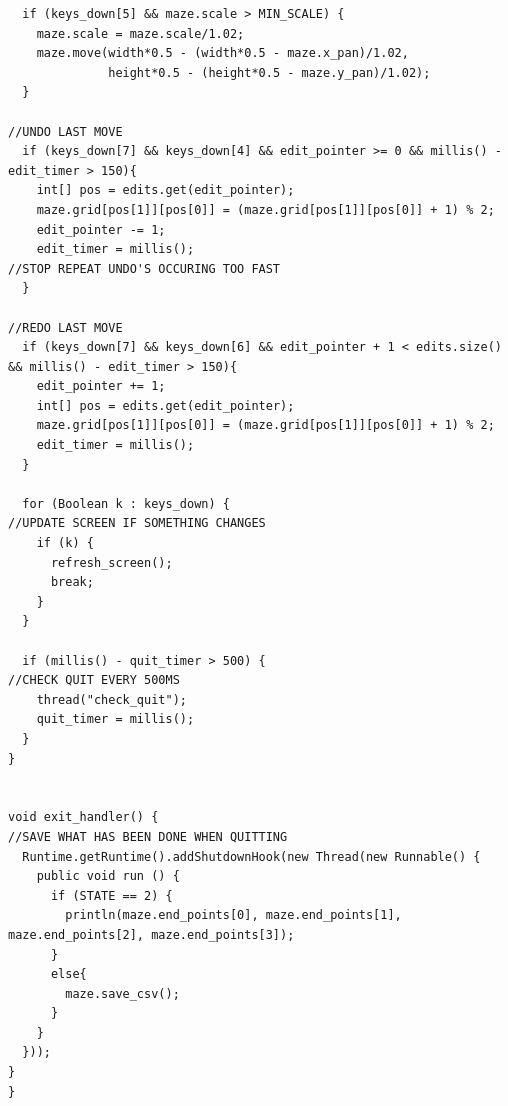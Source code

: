 \documentclass[titlepage]{article}
\begin{document}
\begin{changemargin}{-1in}{-1in}
\begin{verbatim}
  if (keys_down[5] && maze.scale > MIN_SCALE) {
    maze.scale = maze.scale/1.02;
    maze.move(width*0.5 - (width*0.5 - maze.x_pan)/1.02, 
              height*0.5 - (height*0.5 - maze.y_pan)/1.02);
  }
                                                                                //UNDO LAST MOVE
  if (keys_down[7] && keys_down[4] && edit_pointer >= 0 && millis() - edit_timer > 150){
    int[] pos = edits.get(edit_pointer);
    maze.grid[pos[1]][pos[0]] = (maze.grid[pos[1]][pos[0]] + 1) % 2;
    edit_pointer -= 1;
    edit_timer = millis();                                                      //STOP REPEAT UNDO'S OCCURING TOO FAST
  }
                                                                                //REDO LAST MOVE
  if (keys_down[7] && keys_down[6] && edit_pointer + 1 < edits.size() && millis() - edit_timer > 150){
    edit_pointer += 1;
    int[] pos = edits.get(edit_pointer);
    maze.grid[pos[1]][pos[0]] = (maze.grid[pos[1]][pos[0]] + 1) % 2;
    edit_timer = millis();
  }
  
  for (Boolean k : keys_down) {                                                 //UPDATE SCREEN IF SOMETHING CHANGES
    if (k) {
      refresh_screen();
      break;
    }
  }
  
  if (millis() - quit_timer > 500) {                                           //CHECK QUIT EVERY 500MS
    thread("check_quit");
    quit_timer = millis();
  }
}


void exit_handler() {                                                          //SAVE WHAT HAS BEEN DONE WHEN QUITTING
  Runtime.getRuntime().addShutdownHook(new Thread(new Runnable() {
    public void run () {
      if (STATE == 2) {
        println(maze.end_points[0], maze.end_points[1], maze.end_points[2], maze.end_points[3]);
      }
      else{
        maze.save_csv();
      }
    }
  }));
}
} 
\end{verbatim}
\end{changemargin} 

\pagebreak
\end{document}
